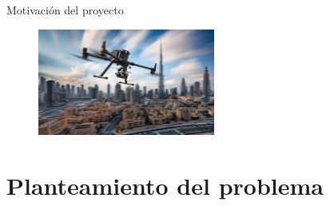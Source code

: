 \documentclass[24pt,aspectratio=169]{beamer}
\begin{document}
\begin{frame}[fragile]{Motivación del proyecto}
\begin{figure}[ht!]
\begin{minipage}{0.48\textwidth}
    \end{minipage}\hfill
    \begin{minipage}{0.48\textwidth}
      \centering
      \includegraphics[width=\linewidth,height=3.5cm]{drone_city.jpg} %
    \end{minipage}
  \end{figure}
\end{frame}

\section{Planteamiento del problema}
\end{document}
